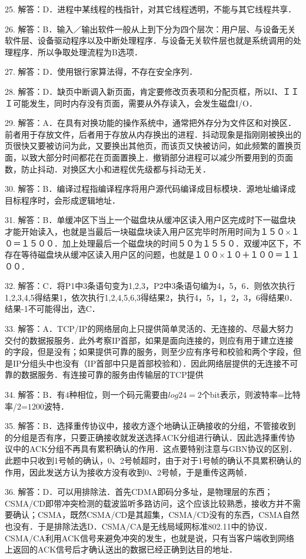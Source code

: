 25. 解答：D．进程中某线程的栈指针，对其它线程透明，不能与其它线程共享．

26. 解答：B．输入／输出软件一般从上到下分为四个层次：用户层、与设备无关软件层、设备驱动程序以及中断处理程序．与设备无关软件层也就是系统调用的处理程序．所以争取处理流程为B选项．

27. 解答：D．使用银行家算法得，不存在安全序列．

28. 解答：D．缺页中断调入新页面，肯定要修改页表项和分配页框，所以I、ＩＩＩ可能发生，同时内存没有页面，需要从外存读入，会发生磁盘I/O．

29. 解答：A．在具有对换功能的操作系统中，通常把外存分为文件区和对换区．前者用于存放文件，后者用于存放从内存换出的进程．抖动现象是指刚刚被换出的页很快又要被访问为此，又要换出其他页，而该页又快被访问，如此频繁的置换页面，以致大部分时间都花在页面置换上．撤销部分进程可以减少所要用到的页面数，防止抖动．对换区大小和进程优先级都与抖动无关．

30. 解答：B．编译过程指编译程序将用户源代码编译成目标模块．源地址编译成目标程序时，会形成逻辑地址．

31. 解答：B．单缓冲区下当上一个磁盘块从缓冲区读入用户区完成时下一磁盘块才能开始读入，也就是当最后一块磁盘块读入用户区完毕时所用时间为１５０×１０＝１５００．加上处理最后一个磁盘块的时间５０为１５５０．双缓冲区下，不存在等待磁盘块从缓冲区读入用户区的问题，也就是１００×１０＋１００＝１１００．

32. 解答：C．将P1中3条语句变为1,2,3，P2中3条语句编为4，5，6．则依次执行1,2,3,4,5得结果1，依次执行1,2,4,5,6,3得结果2，执行4，5，1，2，3，6得结果0．结果-1不可能得出，选C．

33. 解答：A．TCP/IP的网络层向上只提供简单灵活的、无连接的、尽最大努力交付的数据报服务．此外考察IP首部，如果是面向连接的，则应有用于建立连接的字段，但是没有；如果提供可靠的服务，则至少应有序号和校验和两个字段，但是IP分组头中也没有（IP首部中只是首部校验和）．因此网络层提供的无连接不可靠的数据服务．有连接可靠的服务由传输层的TCP提供

34. 解答：B．有$4$种相位，则一个码元需要由$log24=2$个bit表示，则波特率=比特率/$2$=$1200$波特．

35. 解答：B．选择重传协议中，接收方逐个地确认正确接收的分组，不管接收到的分组是否有序，只要正确接收就发送选择ACK分组进行确认．因此选择重传协议中的ACK分组不再具有累积确认的作用．这点要特别注意与GBN协议的区别．此题中只收到1号帧的确认，0、2号帧超时，由于对于1号帧的确认不具累积确认的作用，因此发送方认为接收方没有收到0、2号帧，于是重传这两帧．

36. 解答：D．可以用排除法．首先CDMA即码分多址，是物理层的东西；CSMA/CD即带冲突检测的载波监听多路访问，这个应该比较熟悉，接收方并不需要确认；CSMA，既然CSMA/CD是其超集，CSMA/CD没有的东西，CSMA自然也没有．于是排除法选D．CSMA/CA是无线局域网标准802.11中的协议．CSMA/CA利用ACK信号来避免冲突的发生，也就是说，只有当客户端收到网络上返回的ACK信号后才确认送出的数据已经正确到达目的地址．

